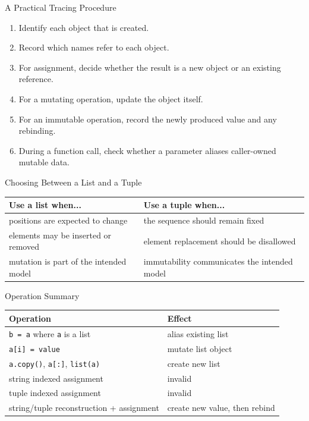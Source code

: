 \documentclass[aspectratio=169,10pt]{beamer}
\begin{document}
\begin{frame}{A Practical Tracing Procedure}
  \begin{enumerate}
    \item Identify each object that is created.
    \item Record which names refer to each object.
    \item For assignment, decide whether the result is a new object or an existing reference.
    \item For a mutating operation, update the object itself.
    \item For an immutable operation, record the newly produced value and any rebinding.
    \item During a function call, check whether a parameter aliases caller-owned mutable data.
  \end{enumerate}
\end{frame}

\begin{frame}{Choosing Between a List and a Tuple}
  \begin{center}
    \renewcommand{\arraystretch}{1.35}
    \begin{tabular}{p{}|p{}}
      \textbf{Use a list when...} & \textbf{Use a tuple when...} \\\hline
      positions are expected to change & the sequence should remain fixed \\
      elements may be inserted or removed & element replacement should be disallowed \\
      mutation is part of the intended model & immutability communicates the intended model
    \end{tabular}
  \end{center}
\end{frame}

\begin{frame}{Operation Summary}
  \begin{center}
    \renewcommand{\arraystretch}{1.22}
    \begin{tabular}{l|l}
      \textbf{Operation} & \textbf{Effect} \\\hline
      \texttt{b = a} where \texttt{a} is a list & alias existing list \\
      \texttt{a[i] = value} & mutate list object \\
      \texttt{a.copy()}, \texttt{a[:]}, \texttt{list(a)} & create new list \\
      string indexed assignment & invalid \\
      tuple indexed assignment & invalid \\
      string/tuple reconstruction + assignment & create new value, then rebind
    \end{tabular}
  \end{center}
\end{frame}
\end{document}
